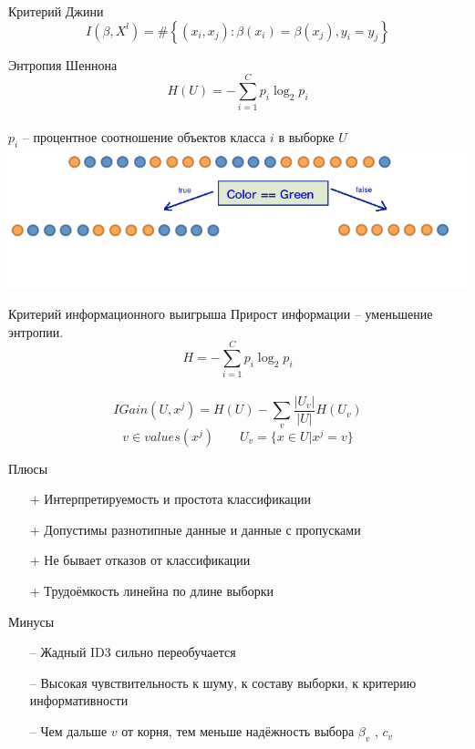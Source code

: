 \documentclass[10pt]{beamer}
\begin{document}
{
\begin{frame}{Критерий Джини}
  $$I(\beta,X^l)= \# \left\{ (x_i, x_j): \beta(x_i) = \beta(x_j), y_i = y_j \right\}$$
\end{frame}
}

\begin{frame}{Энтропия Шеннона}
  $$H(U) = - \sum\limits_{i=1}^{C} p_i \log_2 p_i$$\\
  $p_i$ -- процентное соотношение объектов класса $i$ в выборке $U$\\
  \pause
  \bigbreak
  \includegraphics[width = \textwidth, keepaspectratio = true]{images/entropy}
\end{frame}

\begin{frame}{Критерий информационного выигрыша}
  \alert{Прирост информации} -- уменьшение энтропии.
  $$H = - \sum\limits_{i=1}^{C} p_i \log_2 p_i$$\\
	$$IGain(U, x^j) = H(U) - \sum \limits_{v} \frac{\vert U_v\vert}{\vert U \vert} H(U_v) $$
  \bigbreak	
	$$v \in values(x^j) \qquad U_v = \{x \in U| x^j=v\}$$
\end{frame}

\begin{frame}{Плюсы}
	\begin{enumerate}[<+- |alert@+>] 
	\item[+] Интерпретируемость и простота классификации
	\item[+] Допустимы разнотипные данные и данные с пропусками
	\item[+] Не бывает отказов от классификации
	\item[+] Трудоёмкость линейна по длине выборки
	\end{enumerate}
\end{frame}

\begin{frame}{Минусы}
	\begin{enumerate} [<+- |alert@+>] 
	\item[--] Жадный ID3 сильно переобучается
	\item[--] Высокая чувствительность к шуму, к составу выборки, к критерию информативности
	\item[--] Чем дальше $v$ от корня, тем меньше надёжность выбора $\beta_v$ , $c_v$
	\end{enumerate}
\end{frame}
\end{document}
